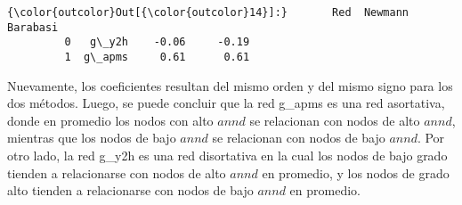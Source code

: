\documentclass[11pt]{article}
\begin{document}
\begin{Verbatim}[commandchars=\\\{\}]
{\color{outcolor}Out[{\color{outcolor}14}]:}       Red  Newmann  Barabasi
         0   g\_y2h    -0.06     -0.19
         1  g\_apms     0.61      0.61
\end{Verbatim}
            
    Nuevamente, los coeficientes resultan del mismo orden y del mismo signo
para los dos métodos. Luego, se puede concluir que la red g\_apms es una
red asortativa, donde en promedio los nodos con alto \(annd\) se
relacionan con nodos de alto \(annd\), mientras que los nodos de bajo
\(annd\) se relacionan con nodos de bajo \(annd\). Por otro lado, la red
g\_y2h es una red disortativa en la cual los nodos de bajo grado tienden
a relacionarse con nodos de alto \(annd\) en promedio, y los nodos de
grado alto tienden a relacionarse con nodos de bajo \(annd\) en
promedio.


    
    
    
    
\end{document}
